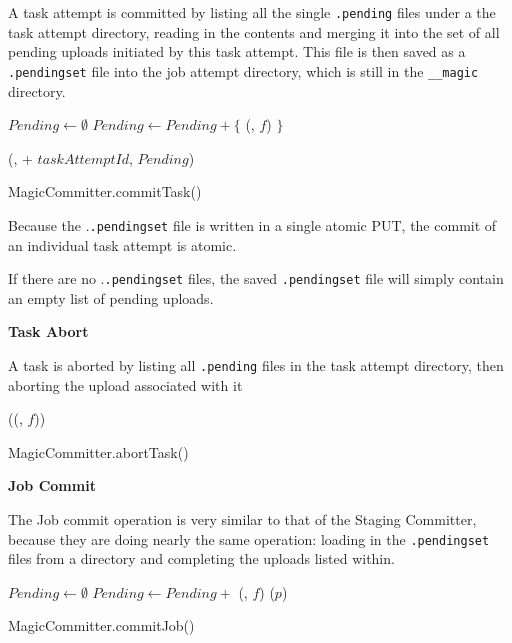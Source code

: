 \documentclass[conference]{IEEEtran}
\begin{document}

A task attempt is committed by listing all the single \texttt{.pending} files
under a the task attempt directory, reading in the contents and merging it
into the set of all pending uploads initiated by this task attempt.
This file is then saved as a \texttt{.pendingset} file into the job attempt directory,
which is still in the \texttt{__magic} directory.

\begin{procedure}
\MagicVars

  $Pending \longleftarrow \emptyset$\;
   {
    $Pending \longleftarrow Pending + \{$ \loadPendingFile(\fs, $f$) $\}$\;
  }

  \savePendingSet(\fs, \jobAttemptPath + $taskAttemptId$, $Pending$)\;

\caption{MagicCommitter.commitTask()}
\label{alg:MagicCommitter.commitTask}

\end{procedure}

Because the .\texttt{.pendingset} file is written in a single atomic PUT, the
commit of an individual task attempt is atomic.

If there are no .\texttt{.pendingset} files, the saved \texttt{.pendingset} file
will simply contain an empty list of pending uploads.


\textbf{Task Abort}

A task is aborted by listing all \texttt{.pending} files in the task attempt directory,
then aborting the upload associated with it

\begin{procedure}
  \MagicVars

   {
    \abortUpload(\loadPendingFile(\fs, $f$))\;
  }

  \caption{MagicCommitter.abortTask()}
  \label{alg:MagicCommitter.abortTask}
\end{procedure}




\textbf{Job Commit}

The Job commit operation is very similar to that of the Staging Committer, because
they are doing nearly the same operation: loading in the \texttt{.pendingset} files
from a directory and completing the uploads listed within.

\begin{procedure}
  \MagicVars

  $Pending \longleftarrow \emptyset$\;
   {
    $Pending \longleftarrow Pending + $ \loadPendingSet(\fs, $f$)\;
  }
   {
    \completeUpload($p$)\;
  }

  \caption{MagicCommitter.commitJob()}
  \label{alg:MagicCommitter.commitJob}
\end{procedure}
\end{document}
